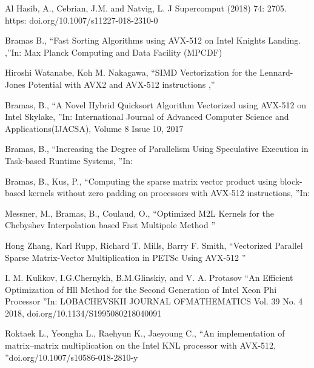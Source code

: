 \documentclass[
11pt,%
tightenlines,%
twoside,%
onecolumn,%
nofloats,%
nobibnotes,%
nofootinbib,%
superscriptaddress,%
noshowpacs,%
centertags]%
{revtex4}
\begin{document}
\begin{thebibliography}{99}
Al Hasib, A., Cebrian, J.M. and Natvig, L. J Supercomput (2018) 74: 2705. https: doi.org/10.1007/s11227-018-2310-0

Bramas B., \textquotedblleft Fast Sorting Algorithms using AVX-512 on Intel Knights Landing. ,\textquotedblright In: Max Planck Computing and Data Facility (MPCDF)

Hiroshi Watanabe, Koh M. Nakagawa, \textquotedblleft SIMD Vectorization for the Lennard-Jones Potential with AVX2 and AVX-512 instructions ,\textquotedblright

Bramas, B., \textquotedblleft A Novel Hybrid Quicksort Algorithm Vectorized using AVX-512 on Intel Skylake, \textquotedblright In: International Journal of Advanced Computer Science and Applications(IJACSA), Volume 8 Issue 10, 2017

Bramas, B., \textquotedblleft Increasing the Degree of Parallelism Using Speculative Execution in Task-based Runtime Systems, \textquotedblright In:

Bramas, B., Kus, P., \textquotedblleft Computing the sparse matrix vector product using block-based kernels without zero padding on processors with AVX-512 instructions, \textquotedblright In:

Messner, M., Bramas, B., Coulaud, O., \textquotedblleft Optimized M2L Kernels for the Chebyshev Interpolation based Fast Multipole Method \textquotedblright

Hong Zhang, Karl Rupp, Richard T. Mills, Barry F. Smith, \textquotedblleft Vectorized Parallel Sparse Matrix-Vector Multiplication in PETSc Using AVX-512 \textquotedblright

I. M. Kulikov, I.G.Chernykh, B.M.Glinskiy, and V. A. Protasov \textquotedblleft An Efficient Optimization of Hll Method for the Second Generation of Intel Xeon Phi Processor \textquotedblright In: LOBACHEVSKII JOURNAL OFMATHEMATICS Vol. 39 No. 4 2018, doi.org/10.1134/S1995080218040091

Roktaek L., Yeongha L., Raehyun K., Jaeyoung C., \textquotedblleft An implementation of matrix–matrix multiplication on the Intel KNL processor with AVX-512, \textquotedblright  doi.org/10.1007/s10586-018-2810-y

\end{thebibliography}
\end{document}
